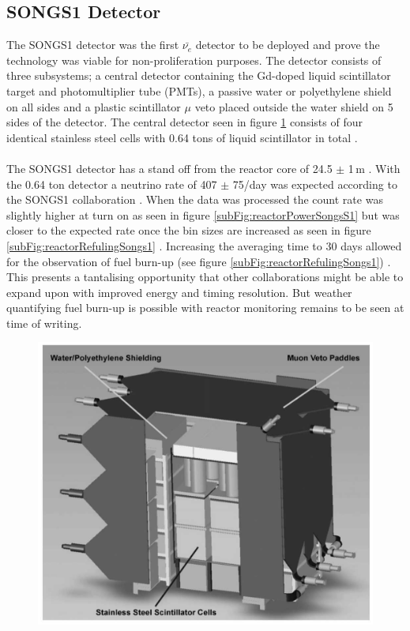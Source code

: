 \subsection{SONGS1 Detector}
The SONGS1 detector \cite{Bowden_2007} was the first $\bar{\nu_e}$ detector to be deployed and prove the technology was viable for non-proliferation purposes. The detector consists of three subsystems; a central detector containing the Gd-doped liquid scintillator target and photomultiplier tube (PMTs), a passive water or polyethylene shield on all sides and a plastic scintillator $\mu$ veto placed outside the water shield on 5 sides of the detector. The central detector seen in figure \ref{fig:SongsS1Detector} consists of four identical stainless steel cells with 0.64 tons of liquid scintillator in total \cite{Bowden_2007}. 
\\\\The SONGS1 detector has a stand off from the reactor core of 24.5 $\pm$ 1\,m \cite{Bowden_2007}. With the 0.64 ton detector a neutrino rate of 407 $\pm$ 75/day was expected according to the SONGS1 collaboration \cite{Bowden_2007}. When the data was processed the count rate was slightly higher at turn on as seen in figure \ref{subFig:reactorPowerSongsS1} but was closer to the expected rate once the bin sizes are increased as seen in figure \ref{subFig:reactorRefulingSongs1} \cite{Bowden_2008}. Increasing the averaging time to 30 days allowed for the observation of fuel burn-up (see figure \ref{subFig:reactorRefulingSongs1}) \cite{Bowden_2008}. This presents a tantalising opportunity that other collaborations might be able to expand upon with improved energy and timing resolution. But weather quantifying fuel burn-up is possible with reactor monitoring remains to be seen at time of writing. 

\begin{figure}[!h]
 \centering
 \includegraphics[width=0.5\linewidth]{Chapter1/Figs/SongsS1Detector.jpg}
 \label{fig:SongsS1Detector}
\end{figure}

